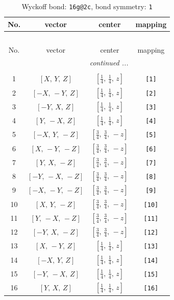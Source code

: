 \documentclass[fleqn,8pt]{jsarticle}
\begin{document}
\begin{longtable}{cccc}
\caption{Wyckoff bond: {\tt 16g@2c}, bond symmetry: {\tt 1}}
 \\
 \hline \hline
No. & vector & center & mapping \\ \hline \endfirsthead

\multicolumn{3}{l}{\tablename\ \thetable{}} \\
 \hline \hline
No. & vector & center & mapping \\ \hline \endhead

 \hline \hline
\multicolumn{3}{r}{\footnotesize\it continued ...} \\ \endfoot

 \hline \hline
\multicolumn{3}{r}{} \\ \endlastfoot

1 & $\left[ X,\, Y,\, Z \right]$ & $\left[ \frac{1}{4},\, \frac{1}{4},\, z \right]$ & {\tt [1]} \\ \hline
2 & $\left[ - X,\, - Y,\, Z \right]$ & $\left[ \frac{1}{4},\, \frac{1}{4},\, z \right]$ & {\tt [2]} \\ \hline
3 & $\left[ - Y,\, X,\, Z \right]$ & $\left[ \frac{1}{4},\, \frac{1}{4},\, z \right]$ & {\tt [3]} \\ \hline
4 & $\left[ Y,\, - X,\, Z \right]$ & $\left[ \frac{1}{4},\, \frac{1}{4},\, z \right]$ & {\tt [4]} \\ \hline
5 & $\left[ - X,\, Y,\, - Z \right]$ & $\left[ \frac{3}{4},\, \frac{3}{4},\, - z \right]$ & {\tt [5]} \\ \hline
6 & $\left[ X,\, - Y,\, - Z \right]$ & $\left[ \frac{3}{4},\, \frac{3}{4},\, - z \right]$ & {\tt [6]} \\ \hline
7 & $\left[ Y,\, X,\, - Z \right]$ & $\left[ \frac{3}{4},\, \frac{3}{4},\, - z \right]$ & {\tt [7]} \\ \hline
8 & $\left[ - Y,\, - X,\, - Z \right]$ & $\left[ \frac{3}{4},\, \frac{3}{4},\, - z \right]$ & {\tt [8]} \\ \hline
9 & $\left[ - X,\, - Y,\, - Z \right]$ & $\left[ \frac{3}{4},\, \frac{3}{4},\, - z \right]$ & {\tt [9]} \\ \hline
10 & $\left[ X,\, Y,\, - Z \right]$ & $\left[ \frac{3}{4},\, \frac{3}{4},\, - z \right]$ & {\tt [10]} \\ \hline
11 & $\left[ Y,\, - X,\, - Z \right]$ & $\left[ \frac{3}{4},\, \frac{3}{4},\, - z \right]$ & {\tt [11]} \\ \hline
12 & $\left[ - Y,\, X,\, - Z \right]$ & $\left[ \frac{3}{4},\, \frac{3}{4},\, - z \right]$ & {\tt [12]} \\ \hline
13 & $\left[ X,\, - Y,\, Z \right]$ & $\left[ \frac{1}{4},\, \frac{1}{4},\, z \right]$ & {\tt [13]} \\ \hline
14 & $\left[ - X,\, Y,\, Z \right]$ & $\left[ \frac{1}{4},\, \frac{1}{4},\, z \right]$ & {\tt [14]} \\ \hline
15 & $\left[ - Y,\, - X,\, Z \right]$ & $\left[ \frac{1}{4},\, \frac{1}{4},\, z \right]$ & {\tt [15]} \\ \hline
16 & $\left[ Y,\, X,\, Z \right]$ & $\left[ \frac{1}{4},\, \frac{1}{4},\, z \right]$ & {\tt [16]} \\
\end{longtable}
\end{document}
